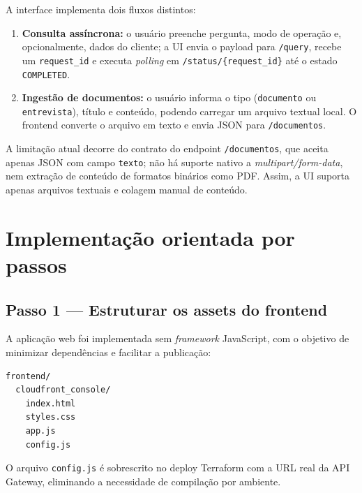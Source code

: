 A interface implementa dois fluxos distintos:

\begin{enumerate}[leftmargin=*]
  \item \textbf{Consulta ass\'incrona:} o usu\'ario preenche pergunta,
        modo de opera\c{c}\~ao e, opcionalmente, dados do cliente; a UI
        envia o payload para \texttt{/query}, recebe um
        \texttt{request\_id} e executa \textit{polling}
        em \texttt{/status/\{request\_id\}} at\'e o estado \texttt{COMPLETED}.
  \item \textbf{Ingest\~ao de documentos:} o usu\'ario informa o tipo
        (\texttt{documento} ou \texttt{entrevista}), t\'itulo e conte\'udo,
        podendo carregar um arquivo textual local. O frontend converte o
        arquivo em texto e envia JSON para \texttt{/documentos}.
\end{enumerate}

A limita\c{c}\~ao atual decorre do contrato do endpoint \texttt{/documentos},
que aceita apenas JSON com campo \texttt{texto}; n\~ao h\'a suporte nativo a
\textit{multipart/form-data}, nem extra\c{c}\~ao de conte\'udo de formatos
bin\'arios como PDF. Assim, a UI suporta apenas arquivos textuais e colagem
manual de conte\'udo.

\section{Implementa\c{c}\~ao orientada por passos}

\subsection{Passo 1 --- Estruturar os assets do frontend}

A aplica\c{c}\~ao web foi implementada sem \textit{framework} JavaScript,
com o objetivo de minimizar depend\^encias e facilitar a publica\c{c}\~ao:

\begin{lstlisting}[language=bash,
  caption={Estrutura dos arquivos est\'aticos do console web.},
  label={lst:frontend_assets}]
frontend/
  cloudfront_console/
    index.html
    styles.css
    app.js
    config.js
\end{lstlisting}

O arquivo \texttt{config.js} \'e sobrescrito no deploy
Terraform com a URL real da API Gateway, eliminando a necessidade de
compila\c{c}\~ao por ambiente.

